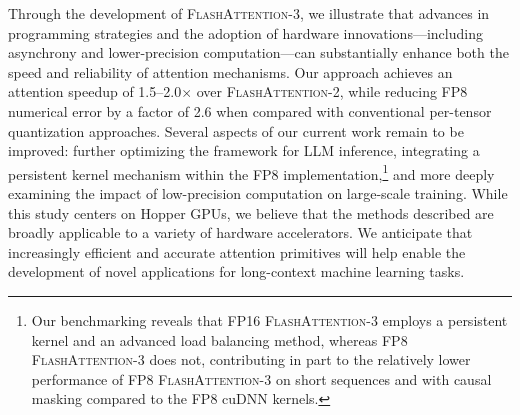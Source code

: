 Through the development of \textsc{FlashAttention-3}, we illustrate that advances in programming strategies and the adoption of hardware innovations—including asynchrony and lower-precision computation—can substantially enhance both the speed and reliability of attention mechanisms. Our approach achieves an attention speedup of 1.5–2.0$\times$ over \textsc{FlashAttention-2}, while reducing FP8 numerical error by a factor of 2.6 when compared with conventional per-tensor quantization approaches. Several aspects of our current work remain to be improved: further optimizing the framework for LLM inference, integrating a persistent kernel mechanism within the FP8 implementation,\footnote{Our benchmarking reveals that FP16 \textsc{FlashAttention-3} employs a persistent kernel and an advanced load balancing method, whereas FP8 \textsc{FlashAttention-3} does not, contributing in part to the relatively lower performance of FP8 \textsc{FlashAttention-3} on short sequences and with causal masking compared to the FP8 cuDNN kernels.} and more deeply examining the impact of low-precision computation on large-scale training. While this study centers on Hopper GPUs, we believe that the methods described are broadly applicable to a variety of hardware accelerators. We anticipate that increasingly efficient and accurate attention primitives will help enable the development of novel applications for long-context machine learning tasks.

